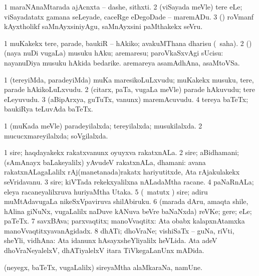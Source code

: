 \noindent 
\gl{\pagu}
\expl{}
\bmng
\bnum
\num{1}  maraNAnaMtarada ajAcnxta -- dashe, sithxti. 
\num{2}  (viSayada meVle) tere eLe; viSayadatatx gamana seLeyade, caceRge eDegoDade -- maremADu. 
\num{3}  (\kanmu) roVmanf kAyxtholikf saMnAyxsiniyAgu, saMnAyxsini paMthakekx seVru. 
\enum
\emng
\eentry

\bentry 
{} 
\gl{\sakirx}
\expl{}
\bmng
\bnum
\num{1} muKakekx tere, parade, baukiR -- hAkiko; avakuMThana dharisu (\akirx\ saha). 
\num{2} (\rUpa) (naya nuDi \mo vugaLa) musuku hAku; aremaresu; paroVkaSxvAgi sUcisu:  nayanuDiya musuku hAkida bedarike.  aremareya asamAdhAna, asaMtoVSa. 
\enum
\emng
\eentry

\bentry
{} 
\gl{\nA}
\expl{}
\bmng
\bnum
\num{1} (tereyiMda, paradeyiMda) muKa maresikoLuLxvudu; muKakekx musuku, tere, parade hAkikoLuLxvudu. 
\num{2} (citarx, paTa, \mo vugaLa meVle) parade hAkuvudu; tere eLeyuvudu. 
\num{3} (aBipArxya, guTuTx, \mo vanunx) maremAcuvudu. 
\num{4} tereya baTeTx; baukiRya teLuvAda baTeTx. 
\enum
\emng
\eentry

\bentry
{} 
\gl{\gu}
\expl{}
\bmng
\bnum
\num{1} (muKada meVle) paradeyilalxda; tereyilalxda; musukilalxda. 
\num{2} mucucxmareyilalxda; soVgilalxda. 
\enum
\emng
\eentry

\bentry
{} 
\gl{\nA}
\expl{}
\bmng
\bnum
\num{1} sire; haqdayakekx rakatxvanunx oyuyxva rakatxnALa. 
\num{2} sire; aBidhamani; (sAmAnayx baLakeyalilx) yAvudeV rakatxnALa, dhamani:  avana rakatxnALagaLalilx rAj(manetanada)rakatx hariyutitxde, Ata rAjakulakekx seVridavanu. 
\num{3} sire; kiVTada rekekxyalilxna nALadaMtha racane. 
\num{4} paNaRnALa; eleya racaneyalilxruva huriyaMtha Utaka. 
\num{5} (\BUvi\ matutx \gaNi) sire; adiru muMtAdavugaLa nikeSxVpaviruva shilAbiruku. 
\num{6} (marada dAru, amaqta shile, hAlina giNuNx, \mo vugaLalilx naDuve kANuva beVre baNaNxda) reVKe; gere; eLe; paTeTx. 
\num{7} savxBAva; parxvaqtitx; manoVvaqtitx:  Ata obabx kalapxnAtamxka manoVvaqtitxyavanAgidadx. 
\num{8} dhATi; dhoVraNe; vishiSaTx -- guNa, riVti, sheYli, vidhAna:  Ata idanunx hAsayxsheYliyalilx heVLida.  Ata adeV dhoVraNeyalelxV, dhATiyalelxV itara TiVkegaLanUnx mADida. 
\enum
\emng
\eentry

\bentry
{} 
\gl{\nA}
\expl{}
\bmng
 (neyegx, baTeTx, \mo vugaLalilx) sireyaMtha alaMkaraNa, namUne. 
\emng
\eentry

